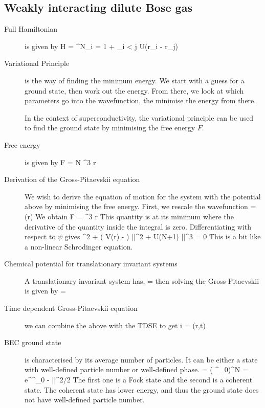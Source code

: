 \subsection{Weakly interacting dilute Bose gas}
\begin{description}
\item[Full Hamiltonian] is given by 
\beq
H = \sum^N_{i = 1}  + \sum_{i < j} U\delta (r_i - r_j) 
\eeq

\item[Variational Principle] is the way of finding the minimum energy. We start with a guess for a ground state, then work out the energy. From there, we look at which parameters go into the wavefunction, the minimise the energy from there. 

In the context of superconductivity, the variational principle can be used to find the ground state by minimising the free energy $F$. 

\item[Free energy] is given by
\beq
F = N \int  \intd^3 r 
\eeq

\item[Derivation of the Gross-Pitaevskii equation] We wish to derive the equation of motion for the system with the potential above by minimising the free energy. First, we rescale the wavefunction 
\beq
\chi =  \psi(r)
\eeq
We obtain
\beq
F = \int \intd^3 r 
\eeq
This quantity is at its minimum where the derivative of the quantity inside the integral is zero. Differentiating with respect to $\psi$ gives
\beq
{} \nabla^2 \psi + \left( V(r) - \mu\right) |\psi|^2  + U(N+1) |\psi|^3 = 0
\eeq
This is a bit like a non-linear Schrodinger equation. 

\item[Chemical potential for translationary invariant systems] A translationary invariant system has, 
\beq
\psi = 
\eeq
then solving the Gross-Pitaevskii is given by 
\beq
\mu = 
\eeq


\item[Time dependent Gross-Pitaevskii equation] we can combine the above with the TDSE to get
\beq
i \hbar {} =  \psi(r,t)
\eeq

\item[BEC ground state] is characterised by its average number of particles. It can be either a state with well-defined particle number or well-defined phase. 
\beq
{} = \left( \psi^\dagger_0\right)^N \ket{\Omega}
\eeq
\beq
\ket{\Psi_\lambda} = e^{\lambda \psi^\dagger_0 - |\lambda|^2/2 } \ket{\Omega}
\eeq
The first one is a Fock state and the second is a coherent state. The coherent state has lower energy, and thus the ground state does not have well-defined particle number. 

\end{description}
